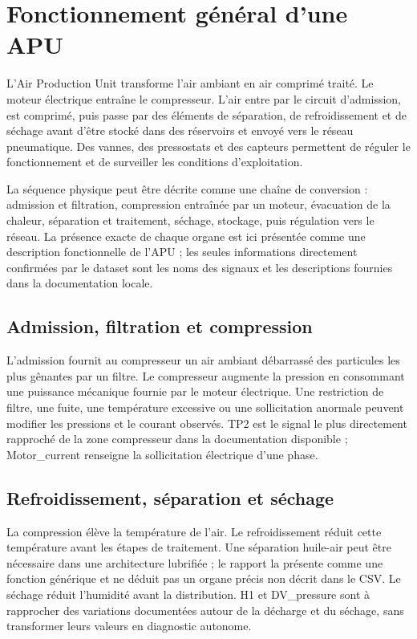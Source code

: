 \section{Fonctionnement général d'une APU}
L'Air Production Unit transforme l'air ambiant en air comprimé traité. Le moteur électrique entraîne le compresseur. L'air entre par le circuit d'admission, est comprimé, puis passe par des éléments de séparation, de refroidissement et de séchage avant d'être stocké dans des réservoirs et envoyé vers le réseau pneumatique. Des vannes, des pressostats et des capteurs permettent de réguler le fonctionnement et de surveiller les conditions d'exploitation.

La séquence physique peut être décrite comme une chaîne de conversion : admission et filtration, compression entraînée par un moteur, évacuation de la chaleur, séparation et traitement, séchage, stockage, puis régulation vers le réseau. La présence exacte de chaque organe est ici présentée comme une description fonctionnelle de l'APU ; les seules informations directement confirmées par le dataset sont les noms des signaux et les descriptions fournies dans la documentation locale.

\subsection{Admission, filtration et compression}
L'admission fournit au compresseur un air ambiant débarrassé des particules les plus gênantes par un filtre. Le compresseur augmente la pression en consommant une puissance mécanique fournie par le moteur électrique. Une restriction de filtre, une fuite, une température excessive ou une sollicitation anormale peuvent modifier les pressions et le courant observés. TP2 est le signal le plus directement rapproché de la zone compresseur dans la documentation disponible ; Motor\_current renseigne la sollicitation électrique d'une phase.

\subsection{Refroidissement, séparation et séchage}
La compression élève la température de l'air. Le refroidissement réduit cette température avant les étapes de traitement. Une séparation huile-air peut être nécessaire dans une architecture lubrifiée ; le rapport la présente comme une fonction générique et ne déduit pas un organe précis non décrit dans le CSV. Le séchage réduit l'humidité avant la distribution. H1 et DV\_pressure sont à rapprocher des variations documentées autour de la décharge et du séchage, sans transformer leurs valeurs en diagnostic autonome.

